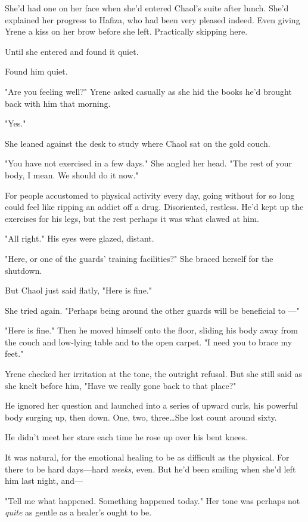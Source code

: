 She'd had one on her face when she'd entered Chaol's suite after lunch.
She'd explained her progress to Hafiza, who had been very pleased indeed.
Even giving Yrene a kiss on her brow before she left.
Practically skipping here.

Until she entered and found it quiet.

Found him quiet.

"Are you feeling well?"
Yrene asked casually as she hid the books he'd brought back with him that morning.

"Yes."

She leaned against the desk to study where Chaol sat on the gold couch.

"You have not exercised in a few days."
She angled her head.
"The rest of your body, I mean.
We should do it now."

For people accustomed to physical activity every day, going without for so long could feel like ripping an addict off a drug.
Disoriented, restless.
He'd kept up the exercises for his legs, but the rest 
perhaps it was what clawed at him.

"All right."
His eyes were glazed, distant.

"Here, or one of the guards' training facilities?"
She braced herself for the shutdown.

But Chaol just said flatly, "Here is fine."

She tried again.
"Perhaps being around the other guards will be beneficial to ---"

"Here is fine."
Then he moved himself onto the floor, sliding his body away from the couch and low-lying table and to the open carpet.
"I need you to brace my feet."

Yrene checked her irritation at the tone, the outright refusal.
But she still said as she knelt before him, "Have we really gone back to that place?"

He ignored her question and launched into a series of upward curls, his powerful body surging up, then down.
One, two, three\ldots She lost count around sixty.

He didn't meet her stare each time he rose up over his bent knees.

It was natural, for the emotional healing to be as difficult as the physical.
For there to be hard days---hard \emph{weeks}, even.
But he'd been smiling when she'd left him last night, and---

"Tell me what happened.
Something happened today."
Her tone was perhaps not \emph{quite} as gentle as a healer's ought to be.

